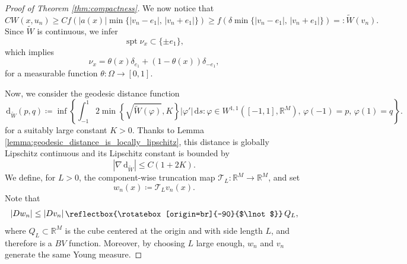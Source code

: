 \documentclass[a4paper, 11pt, reqno]{amsart}
\theoremstyle{plain}
\theoremstyle{definition}
\theoremstyle{remark}
\newcommand{\R}{\mathbb R}
\DeclareMathOperator{\spt}{spt}
\newcommand{\dd}{\,\mathrm{d}}
\newcommand{\restr}{%
  \,\raisebox{-.127ex}{\reflectbox{\rotatebox[origin=br]{-90}{$\lnot$}}}\,%
}
\begin{document}
\begin{proof}[Proof of Theorem \ref{thm:compactness}]
    We now notice that 
    \[
        CW(x,u_n) \geq Cf(|a(x)|\min \{|v_n - e_1|, \, |v_n + e_1| \}) \geq f(\delta \min \{|v_n - e_1|, \, |v_n + e_1| \}) =: \widetilde W(v_n).
    \]
    Since $\widetilde{W}$ is continuous, we infer 
    \[
        \spt \nu_x \subset \{\pm e_1 \},
    \]
    which implies 
    \[
        \nu_x = \theta(x) \delta_{e_1} + (1-\theta(x)) \delta_{-e_1},
    \]
    for a measurable function $\theta: \Omega \to [0,1]$.
    
    Now, we consider the geodesic distance function
    \[
        \dd_{\tilde W}(p,q) \coloneqq \inf \left\{ \int_{-1}^1 2 \min\left\{\sqrt{\widetilde W(\varphi)}, K \right\}|\varphi'| \, \mathrm{d}s : \varphi \in W^{1,1}([-1,1], \R^M), \, \varphi(-1) = p,\, \varphi(1) = q \right\}.
    \]
    for a suitably large constant $K > 0$. Thanks to Lemma \ref{lemma:geodesic_distance_is_locally_lipschitz}, this distance is globally Lipschitz continuous and its Lipschitz constant is bounded by 
    \[
        |\nabla \dd_{\tilde W}| \leq C(1 + 2K).
    \]
    We define, for $L>0$, the component-wise truncation map $\mathcal{T}_L:\R^M\to\R^M$, and set
    \[
    w_n(x) \coloneqq \mathcal{T}_L v_n(x).
    \]
    Note that
    \begin{equation}\label{eq:w_n_restricted_to_Q_L}
        |D w_n| \leq |D v_n|\restr Q_L,
    \end{equation}
    where $Q_L\subset\R^M$ is the cube centered at the origin and with side length $L$, and therefore is a $BV$ function.
    Moreover, by choosing $L$ large enough, $w_n$ and $v_n$ generate the same Young measure.
    

\end{proof}
\end{document}
